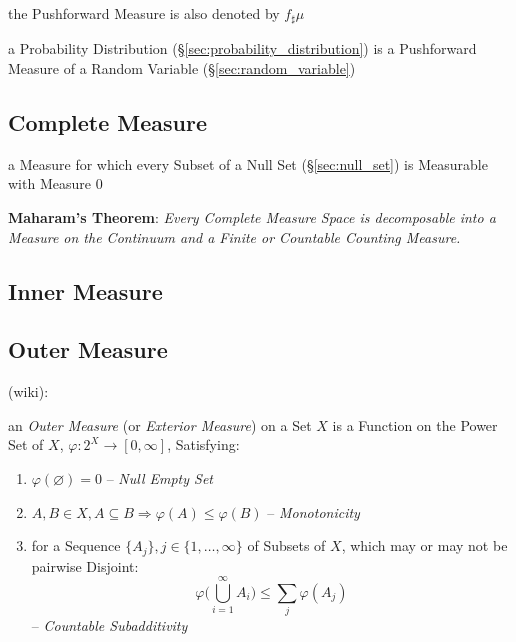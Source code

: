 the Pushforward Measure is also denoted by $f_\sharp\mu$

\fist a Probability Distribution (\S\ref{sec:probability_distribution}) is a
Pushforward Measure of a Random Variable (\S\ref{sec:random_variable})



\subsection{Complete Measure}\label{sec:complete_measure}

a Measure for which every Subset of a Null Set (\S\ref{sec:null_set}) is
Measurable with Measure $0$

\textbf{Maharam's Theorem}: \emph{
  Every Complete Measure Space is decomposable into a Measure on the Continuum
  and a Finite or Countable Counting Measure.
}



\subsection{Inner Measure}\label{sec:inner_measure}

\subsection{Outer Measure}\label{sec:outer_measure}

(wiki):

an \emph{Outer Measure} (or \emph{Exterior Measure}) on a Set $X$ is a Function
on the Power Set of $X$, $\varphi : 2^X \rightarrow [0, \infty]$, Satisfying:
\begin{enumerate}
  \item $\varphi(\varnothing) = 0$ -- \emph{Null Empty Set}
  \item $A,B \in X, A \subseteq B \Rightarrow \varphi(A) \leq \varphi(B)$ --
    \emph{Monotonicity}
  \item for a Sequence $\{A_j\}, j \in \{1, \ldots, \infty\}$ of Subsets of $X$,
    which may or may not be pairwise Disjoint:
    \[
      \varphi\Big(\bigcup_{i=1}^\infty A_i\Big) \leq \sum_j\varphi(A_j)
    \]
    -- \emph{Countable Subadditivity}
\end{enumerate}


